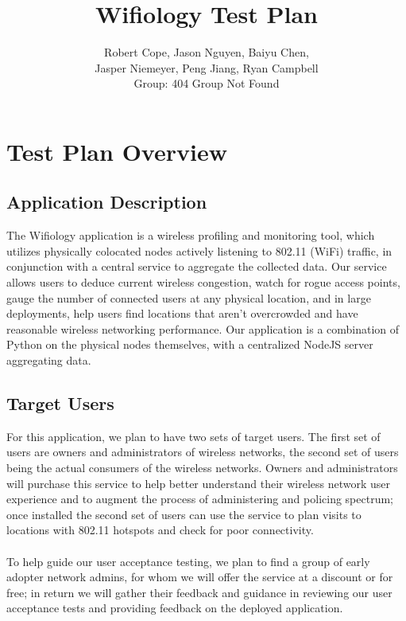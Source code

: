 \documentclass[]{article}
\begin{document}
	\title{Wifiology Test Plan}
	\author{
	Robert Cope, Jason Nguyen, Baiyu Chen,  \\
	Jasper Niemeyer, Peng Jiang, Ryan Campbell\\
	Group: 404 Group Not Found}
	\maketitle

	\section{Test Plan Overview}
	\subsection{Application Description}

    The Wifiology application is a wireless profiling and monitoring tool, which utilizes physically colocated nodes 
    actively listening to 802.11 (WiFi) traffic, in conjunction with a central service to aggregate the collected data.
    Our service allows users to deduce current wireless congestion, watch for rogue access points, gauge the number of 
    connected users at any physical location, and in large deployments, help users find locations that aren't overcrowded
    and have reasonable wireless networking performance. Our application is a combination of Python on the physical nodes
    themselves, with a centralized NodeJS server aggregating data.
	
	\subsection{Target Users}
	
	For this application, we plan to have two sets of target users. The first set of users are owners and administrators
	of wireless networks, the second set of users being the actual consumers of the wireless networks. Owners and 
	administrators will purchase this service to help better understand their wireless network user experience and to
	augment the process of administering and policing spectrum; once installed the second set of users can use the
	service to plan visits to locations with 802.11 hotspots and check for poor connectivity.
	
	\paragraph{}
	To help guide our user acceptance testing, we plan to find a group of early adopter network admins, for whom
	we will offer the service at a discount or for free; in return we will gather their feedback and guidance in 
	reviewing our user acceptance tests and providing feedback on the deployed application.
	
\end{document}
